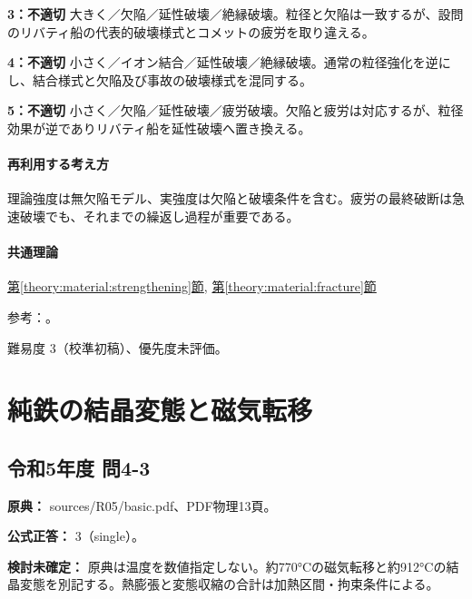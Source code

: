 \noindent\textbf{3：不適切} 大きく／欠陥／延性破壊／絶縁破壊。粒径と欠陥は一致するが、設問のリバティ船の代表的破壊様式とコメットの疲労を取り違える。\par

\noindent\textbf{4：不適切} 小さく／イオン結合／延性破壊／絶縁破壊。通常の粒径強化を逆にし、結合様式と欠陥及び事故の破壊様式を混同する。\par

\noindent\textbf{5：不適切} 小さく／欠陥／延性破壊／疲労破壊。欠陥と疲労は対応するが、粒径効果が逆でありリバティ船を延性破壊へ置き換える。\par

\paragraph{再利用する考え方} 理論強度は無欠陥モデル、実強度は欠陥と破壊条件を含む。疲労の最終破断は急速破壊でも、それまでの繰返し過程が重要である。

\paragraph{共通理論} \hyperref[theory:material:strengthening]{第\ref*{theory:material:strengthening}節}, \hyperref[theory:material:fracture]{第\ref*{theory:material:fracture}節}

\par 参考：\cite{mit_material_dislocations2001,mit_material_fracture2001,mit_material_fatigue2001,nist_fracture_history2010}。

\par 難易度 3（校準初稿）、優先度未評価。

\section{純鉄の結晶変態と磁気転移}

\subsection{令和5年度 問4-3}
\label{q:r05-reg-basic-4-3}

\noindent\textbf{原典：} sources/R05/basic.pdf、PDF物理13頁。

\textbf{公式正答：} 3（single）。

\par\textbf{検討未確定：} 原典は温度を数値指定しない。約770°Cの磁気転移と約912°Cの結晶変態を別記する。熱膨張と変態収縮の合計は加熱区間・拘束条件による。

